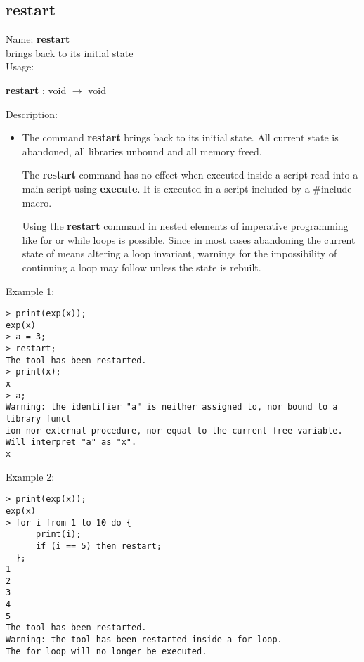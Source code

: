 \subsection{restart}
\label{labrestart}
\noindent Name: \textbf{restart}\\
\phantom{aaa}brings \sollya back to its initial state\\[0.2cm]
\noindent Usage: 
\begin{center}
\textbf{restart} : \textsf{void} $\rightarrow$ \textsf{void}\\
\end{center}
\noindent Description: \begin{itemize}

\item The command \textbf{restart} brings \sollya back to its initial state.  All
   current state is abandoned, all libraries unbound and all memory freed.
    
   The \textbf{restart} command has no effect when executed inside a \sollya
   script read into a main \sollya script using \textbf{execute}. It is executed
   in a \sollya script included by a $\#$include macro.
    
   Using the \textbf{restart} command in nested elements of imperative
   programming like for or while loops is possible. Since in most cases
   abandoning the current state of \sollya means altering a loop
   invariant, warnings for the impossibility of continuing a loop may
   follow unless the state is rebuilt.
\end{itemize}
\noindent Example 1: 
\begin{center}\begin{minipage}{15cm}\begin{Verbatim}[frame=single,commandchars=\\\|\~]
> print(exp(x));
exp(x)
> a = 3;
> restart;
The tool has been restarted.
> print(x);
x
> a;
Warning: the identifier "a" is neither assigned to, nor bound to a library funct
ion nor external procedure, nor equal to the current free variable.
Will interpret "a" as "x".
x
\end{Verbatim}
\end{minipage}\end{center}
\noindent Example 2: 
\begin{center}\begin{minipage}{15cm}\begin{Verbatim}[frame=single,commandchars=\\\|\~]
> print(exp(x));
exp(x)
> for i from 1 to 10 do {
      print(i);
      if (i == 5) then restart;
  };
1
2
3
4
5
The tool has been restarted.
Warning: the tool has been restarted inside a for loop.
The for loop will no longer be executed.
\end{Verbatim}
\end{minipage}\end{center}
